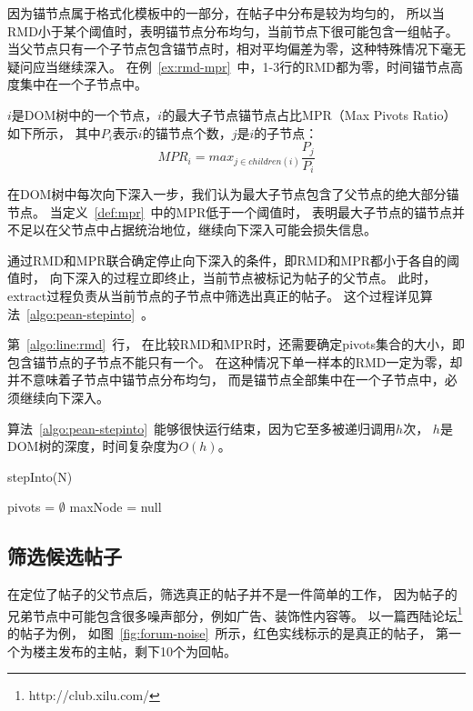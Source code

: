 因为锚节点属于格式化模板中的一部分，在帖子中分布是较为均匀的，
所以当RMD小于某个阈值时，表明锚节点分布均匀，当前节点下很可能包含一组帖子。
当父节点只有一个子节点包含锚节点时，相对平均偏差为零，这种特殊情况下毫无疑问应当继续深入。
在例~\ref{ex:rmd-mpr}~中，1-3行的RMD都为零，时间锚节点高度集中在一个子节点中。

\begin{definition}
\label{def:mpr}
$i$是DOM树中的一个节点，$i$的最大子节点锚节点占比MPR（Max Pivots Ratio）如下所示，
其中$P_i$表示$i$的锚节点个数，$j$是$i$的子节点：
\begin{equation}
MPR_i = max_{j \in children(i)} \frac{P_j}{P_i}
\end{equation}
\end{definition}

在DOM树中每次向下深入一步，我们认为最大子节点包含了父节点的绝大部分锚节点。
当定义~\ref{def:mpr}~中的MPR低于一个阈值时，
表明最大子节点的锚节点并不足以在父节点中占据统治地位，继续向下深入可能会损失信息。

通过RMD和MPR联合确定停止向下深入的条件，即RMD和MPR都小于各自的阈值时，
向下深入的过程立即终止，当前节点被标记为帖子的父节点。
此时，extract过程负责从当前节点的子节点中筛选出真正的帖子。
这个过程详见算法~\ref{algo:pean-stepinto}~。

第~\ref{algo:line:rmd}~行，
在比较RMD和MPR时，还需要确定pivots集合的大小，即包含锚节点的子节点不能只有一个。
在这种情况下单一样本的RMD一定为零，却并不意味着子节点中锚节点分布均匀，
而是锚节点全部集中在一个子节点中，必须继续向下深入。

算法~\ref{algo:pean-stepinto}~能够很快运行结束，因为它至多被递归调用$h$次，
$h$是DOM树的深度，时间复杂度为$O(h)$。

\begin{algorithm}[htbp]
\caption{stepInto(N)}
\label{algo:pean-stepinto}

pivots = $\emptyset$ \;
maxNode = null \;

\end{algorithm}

\subsection{筛选候选帖子}
在定位了帖子的父节点后，筛选真正的帖子并不是一件简单的工作，
因为帖子的兄弟节点中可能包含很多噪声部分，例如广告、装饰性内容等。
以一篇西陆论坛\footnote{http://club.xilu.com/}的帖子为例，
如图~\ref{fig:forum-noise}~所示，红色实线标示的是真正的帖子，
第一个为楼主发布的主帖，剩下10个为回帖。

